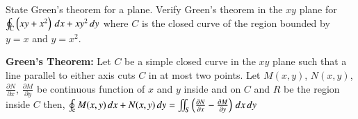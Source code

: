 \documentclass[11pt]{extarticle}
\newcommand{\dx}{{\,dx}}
\newcommand{\dy}{{\,dy}}
\newcommand{\osint}[1][]{\oint\displaylimits_\mathrm{#1}}
\newcommand{\miint}{\iint\displaylimits}
\begin{document}



\textbf{} State Green's theorem for a plane. Verify Green's theorem in the $xy$ plane for $\osint[C]\left(x y+x^2\right) \dx+x y^2 \dy$ where $C$ is the closed curve of the region bounded by $y=x$ and $y=x^2$.

\textbf{Green's Theorem:} Let $C$ be a simple closed curve in the $xy$ plane such that a line parallel to either axis cuts $C$ in at most two points.
Let $M(x,y)$, $N(x,y)$, $\frac{\partial N}{\partial x}$, $\frac{\partial M}{\partial y}$ be continuous function of $x$ and $y$ inside and on $C$ and $R$ be the region inside $C$ then, $\osint[c] M(x,y)\dx+N(x,y)\dy = \miint_S \left(\frac{\partial N}{\partial x} - \frac{\partial M}{\partial y}\right) \dx\dy$

\end{document}
